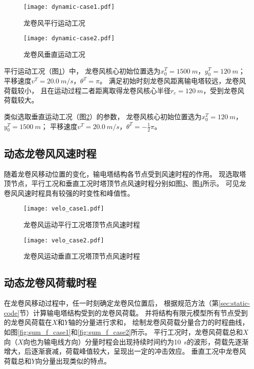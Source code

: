 \begin{figure}[!htpb]
    \centering
    \texttt{[image: dynamic-case1.pdf]}
    \caption{龙卷风平行运动工况}
    \label{fig:dynamic-case1}
\end{figure}

\begin{figure}[!htpb]
    \centering
    \texttt{[image: dynamic-case2.pdf]}
    \caption{龙卷风垂直运动工况}
    \label{fig:dynamic-case2}
\end{figure}

平行运动工况（图\ref{fig:dynamic-case1}）中，
龙卷风核心初始位置选为$x_0^T=\SI{1500}{m}$，$y_0^T=\SI{120}{m}$；
平移速度$v^T=\SI{20.0}{m/s}$，$\theta^T=\pi$。
满足初始时刻龙卷风距离输电塔较远，龙卷风荷载较小，
且在运动过程二者距离取得龙卷风核心半径$r_c=\SI{120}{m}$，受到龙卷风荷载较大。

类似选取垂直运动工况（图\ref{fig:dynamic-case2}）的参数，
龙卷风核心初始位置选为$x_0^T=\SI{120}{m}$，$y_0^T=\SI{1500}{m}$；
平移速度$v^T=\SI{20.0}{m/s}$，$\theta^T=-\frac{1}{2}\pi$。

\subsection{动态龙卷风风速时程}
随着龙卷风移动位置的变化，输电塔结构各节点受到风速时程的作用。
现选取塔顶节点，平行工况和垂直工况时塔顶节点风速时程分别如图\ref{fig:velo_case1}、图\ref{fig:velo_case2}所示。
可见龙卷风风速时程具有较强的时变性和峰值性。

\begin{figure}[!htpb]
    \centering
    \texttt{[image: velo\_case1.pdf]}
    \caption{龙卷风运动平行工况塔顶节点风速时程}
    \label{fig:velo_case1}
\end{figure}

\begin{figure}[!htpb]
    \centering
    \texttt{[image: velo\_case2.pdf]}
    \caption{龙卷风运动垂直工况塔顶节点风速时程}
    \label{fig:velo_case2}
\end{figure}

\subsection{动态龙卷风荷载时程}
在龙卷风移动过程中，任一时刻确定龙卷风位置后，
根据规范方法（第\ref{sec:static-code}节）计算输电塔结构受到的龙卷风荷载。
并将结构有限元模型所有节点受到的龙卷风荷载在$X$和$Y$轴的分量进行求和，
绘制龙卷风荷载分量合力的时程曲线，如图\ref{fig:sum_f_case1}和\ref{fig:sum_f_case2}所示。
平行工况时，龙卷风荷载总和$X$向（$X$向也为输电线方向）分量时程会出现持续时间约为\SI{10}{s}的波形，荷载先逐渐增大，后逐渐衰减，荷载峰值较大，呈现出一定的冲击效应。
垂直工况中龙卷风荷载总和$Y$向分量出现类似的特点。


